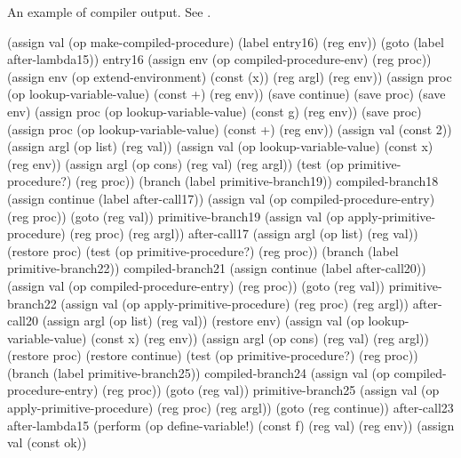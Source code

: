 \begin{exerciseGroup}
\begin{codeFigure}{An example of compiler output. See .}
\begin{compactCodeBlock}
(assign val
        (op make-compiled-procedure)
        (label entry16)
        (reg env))
  (goto (label after-lambda15))
entry16
  (assign env (op compiled-procedure-env) (reg proc))
  (assign env
          (op extend-environment)
          (const (x))
          (reg argl)
          (reg env))
  (assign proc
          (op lookup-variable-value)
          (const +)
          (reg env))
  (save continue)
  (save proc)
  (save env)
  (assign proc
          (op lookup-variable-value)
          (const g)
          (reg env))
  (save proc)
  (assign proc
          (op lookup-variable-value)
          (const +)
          (reg env))
  (assign val (const 2))
  (assign argl (op list) (reg val))
  (assign val
          (op lookup-variable-value)
          (const x)
          (reg env))
  (assign argl (op cons) (reg val) (reg argl))
  (test (op primitive-procedure?) (reg proc))
  (branch (label primitive-branch19))
compiled-branch18
  (assign continue (label after-call17))
  (assign val (op compiled-procedure-entry) (reg proc))
  (goto (reg val))
primitive-branch19
  (assign val
          (op apply-primitive-procedure)
          (reg proc)
          (reg argl))
after-call17
  (assign argl (op list) (reg val))
  (restore proc)
  (test (op primitive-procedure?) (reg proc))
  (branch (label primitive-branch22))
compiled-branch21
  (assign continue (label after-call20))
  (assign val (op compiled-procedure-entry) (reg proc))
  (goto (reg val))
primitive-branch22
  (assign val
          (op apply-primitive-procedure)
          (reg proc)
          (reg argl))
after-call20
  (assign argl (op list) (reg val))
  (restore env)
  (assign val
          (op lookup-variable-value)
          (const x)
          (reg env))
  (assign argl (op cons) (reg val) (reg argl))
  (restore proc)
  (restore continue)
  (test (op primitive-procedure?) (reg proc))
  (branch (label primitive-branch25))
compiled-branch24
  (assign val
          (op compiled-procedure-entry)
          (reg proc))
  (goto (reg val))
primitive-branch25
  (assign val
          (op apply-primitive-procedure)
          (reg proc)
          (reg argl))
  (goto (reg continue))
after-call23
after-lambda15
  (perform (op define-variable!)
           (const f)
           (reg val)
           (reg env))
  (assign val (const ok))
\end{compactCodeBlock}
\end{codeFigure}


\end{exerciseGroup}
